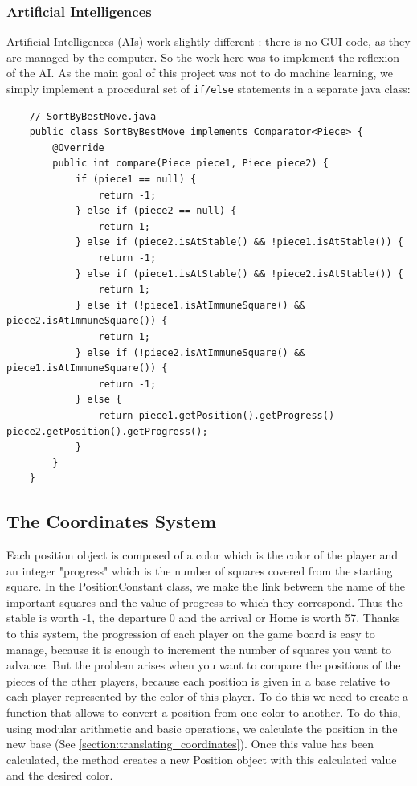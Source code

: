 \documentclass[english, 11pt, titlepage]{article}
\begin{document}
    \subsubsection{Artificial Intelligences}
    Artificial Intelligences (AIs) work slightly different : there is no GUI code, as they are managed by the computer. So the work here was to implement the reflexion of the AI. As the main goal of this project was not to do machine learning, we simply implement a procedural set of \verb|if/else| statements in a separate java class:
    \begin{lstlisting}
    // SortByBestMove.java
    public class SortByBestMove implements Comparator<Piece> {
        @Override
        public int compare(Piece piece1, Piece piece2) {
            if (piece1 == null) {
                return -1;
            } else if (piece2 == null) {
                return 1;
            } else if (piece2.isAtStable() && !piece1.isAtStable()) {
                return -1;
            } else if (piece1.isAtStable() && !piece2.isAtStable()) {
                return 1;
            } else if (!piece1.isAtImmuneSquare() && piece2.isAtImmuneSquare()) {
                return 1;
            } else if (!piece2.isAtImmuneSquare() && piece1.isAtImmuneSquare()) {
                return -1;
            } else {
                return piece1.getPosition().getProgress() - piece2.getPosition().getProgress();
            }
        }
    }
    \end{lstlisting}

    \subsection{The Coordinates System}
    Each position object is composed of a color which is the color of the player and an integer "progress" which is the number of squares covered from the starting square. In the PositionConstant class, we make the link between the name of the important squares and the value of progress to which they correspond. Thus the stable is worth -1, the departure 0 and the arrival or Home is worth 57. Thanks to this system, the progression of each player on the game board is easy to manage, because it is enough to increment the number of squares you want to advance. But the problem arises when you want to compare the positions of the pieces of the other players, because each position is given in a base relative to each player represented by the color of this player. To do this we need to create a function that allows to convert a position from one color to another. To do this, using modular arithmetic and basic operations, we calculate the position in the new base (See \autoref{section:translating_coordinates}). Once this value has been calculated, the method creates a new Position object with this calculated value and the desired color.
\end{document}
